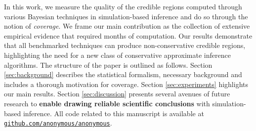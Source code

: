 \documentclass[twoside]{article}
\newcommand{\joeri}[1]{\textcolor{red}{JH: #1}}
\newcommand{\arnaud}[1]{\textcolor{blue}{AD: #1}}
\begin{document}
In this work, we measure the quality of the credible regions computed through various Bayesian techniques in simulation-based inference and do so through the notion of \emph{coverage}. 
We frame our main contribution as the collection of extensive empirical evidence that required months of computation. 
Our results demonstrate that all benchmarked techniques can produce non-conservative credible regions, highlighting the need for a new class of conservative approximate inference algorithms.
The structure of the paper is outlined as follows.
Section \ref{sec:background} describes the statistical formalism, necessary background and includes a thorough motivation for coverage.
Section \ref{sec:experiments} highlights our main results.
Section \ref{sec:discussion} presents several avenues of future research to {\bfseries enable drawing reliable scientific conclusions} with simulation-based inference. All code related to this manuscript is available at
\href{https://github.com/anonymous/anonymous}{\texttt{github.com/anonymous/anonymous}}.





\end{document}
